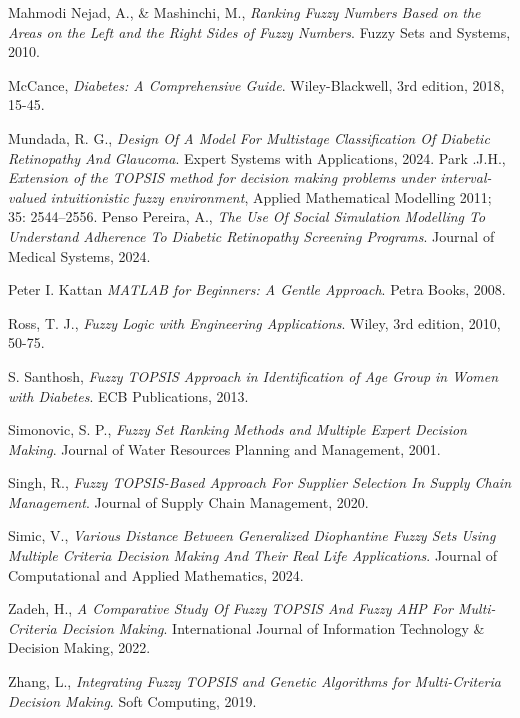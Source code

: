 \documentclass[12pt,a4paper]{article}
\begin{document}
\begin{thebibliography}{10}
\bibitem{}
Mahmodi Nejad, A., \& Mashinchi, M., 
\textit{Ranking Fuzzy Numbers Based on the Areas on the Left and the Right Sides of Fuzzy Numbers}.
Fuzzy Sets and Systems, 2010.

\bibitem{}
McCance, 
\textit{Diabetes: A Comprehensive Guide}.
Wiley-Blackwell, 3rd edition, 2018, 15-45.

\bibitem{}
Mundada, R. G., 
\textit{Design Of A Model For Multistage Classification Of Diabetic Retinopathy And Glaucoma}.
Expert Systems with Applications, 2024.
\bibitem{}
Park .J.H.,  \textit{Extension of the TOPSIS method for decision making problems under interval-valued intuitionistic fuzzy environment}, Applied Mathematical Modelling 2011; 35: 2544–2556.
\bibitem{}
Penso Pereira, A., 
\textit{The Use Of Social Simulation Modelling To Understand Adherence To Diabetic Retinopathy Screening Programs}.
Journal of Medical Systems, 2024.

\bibitem{}
 Peter I. Kattan
\textit{MATLAB for Beginners: A Gentle Approach}.
Petra Books, 2008.

\bibitem{}
Ross, T. J.,  
\textit{Fuzzy Logic with Engineering Applications}.
Wiley, 3rd edition, 2010, 50-75.

\bibitem{}
S. Santhosh,  
\textit{Fuzzy TOPSIS Approach in Identification of Age Group in Women with Diabetes}.
ECB Publications, 2013.

\bibitem{}
Simonovic, S. P.,  
\textit{Fuzzy Set Ranking Methods and Multiple Expert Decision Making}.
Journal of Water Resources Planning and Management, 2001.

\bibitem{}
Singh, R., 
\textit{Fuzzy TOPSIS-Based Approach For Supplier Selection In Supply Chain Management}.
Journal of Supply Chain Management, 2020.

\bibitem{}
Simic, V.,  
\textit{Various Distance Between Generalized Diophantine Fuzzy Sets Using Multiple Criteria Decision Making And Their Real Life Applications}.
Journal of Computational and Applied Mathematics, 2024.

\bibitem{}
Zadeh, H., 
\textit{A Comparative Study Of Fuzzy TOPSIS And Fuzzy AHP For Multi-Criteria Decision Making}.
International Journal of Information Technology \& Decision Making, 2022.

\bibitem{}
Zhang, L.,  
\textit{Integrating Fuzzy TOPSIS and Genetic Algorithms for Multi-Criteria Decision Making}.
Soft Computing, 2019.

\end{thebibliography}
\end{document}
